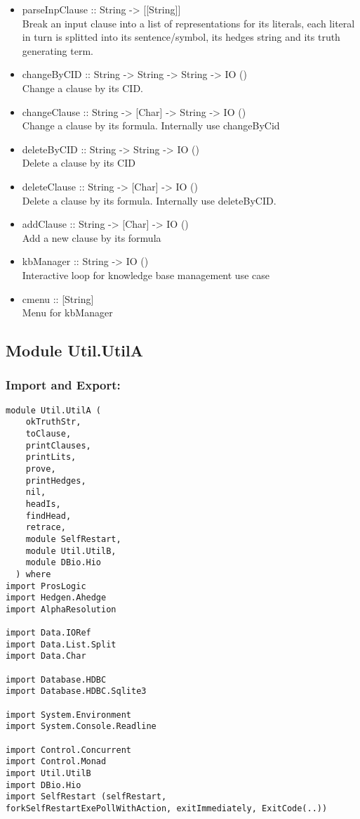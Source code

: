 \documentclass[../gr-final.tex]{subfiles}
\begin{document}
\begin{itemize}
        \item parseInpClause :: String -> [[String]]\\
                Break an input clause into a list of
                representations for its literals, each literal
                in turn is splitted into its sentence/symbol, its
                hedges string and its truth generating term.
        \item changeByCID :: String -> String -> String -> IO
                ()\\
                Change a clause by its CID.
        \item changeClause :: String -> [Char] -> String -> IO
                ()\\
                Change a clause by its formula. Internally use
                changeByCid
        \item deleteByCID :: String -> String -> IO ()\\
                Delete a clause by its CID
        \item deleteClause :: String -> [Char] -> IO ()\\
                Delete a clause by its formula. Internally use
                deleteByCID.
        \item addClause :: String -> [Char] -> IO ()\\
                Add a new clause by its formula
        \item kbManager :: String -> IO ()\\
                Interactive loop for knowledge base management
                use case
        \item cmenu :: [String] \\
                Menu for kbManager

\end{itemize}
\subsection{Module Util.UtilA}
\subsubsection{Import and Export:}
\begin{lstlisting}
module Util.UtilA (
    okTruthStr,
    toClause,
    printClauses,
    printLits,
    prove,
    printHedges,    
    nil,
    headIs,
    findHead,
    retrace,
    module SelfRestart,
    module Util.UtilB, 
    module DBio.Hio
  ) where
import ProsLogic
import Hedgen.Ahedge
import AlphaResolution

import Data.IORef
import Data.List.Split
import Data.Char

import Database.HDBC
import Database.HDBC.Sqlite3

import System.Environment
import System.Console.Readline

import Control.Concurrent
import Control.Monad
import Util.UtilB
import DBio.Hio
import SelfRestart (selfRestart,
forkSelfRestartExePollWithAction, exitImmediately, ExitCode(..))

\end{lstlisting}
\end{document}
